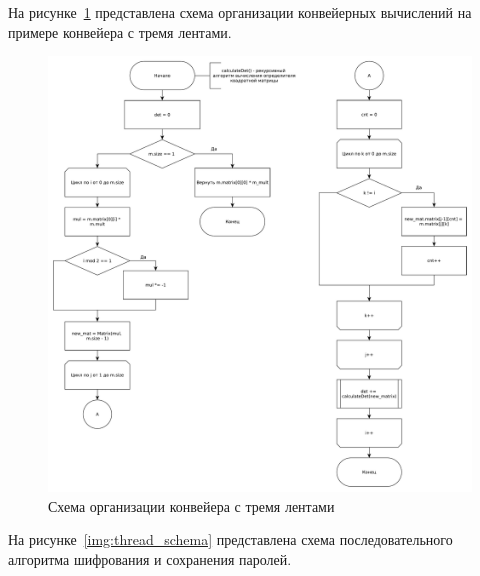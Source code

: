 \documentclass[a4paper,oneside,14pt]{extreport}
\begin{document}
На рисунке~\ref{img:count_det} представлена схема организации конвейерных вычислений на примере конвейера с тремя лентами.
\begin{figure}[H]
	\centering
	\includegraphics[width=1.00\linewidth]{images/count_det}
	\caption{Схема организации конвейера с тремя лентами}
	\label{img:count_det}
\end{figure}

На рисунке~\ref{img:thread_schema} представлена схема последовательного алгоритма шифрования и сохранения паролей.
\end{document}
